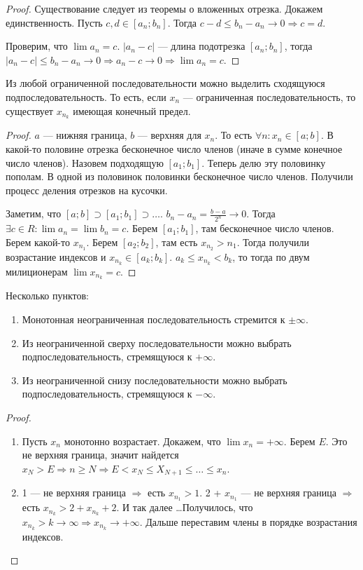 \begin{proof}
    Существование следует из теоремы о вложенных отрезка. Докажем единственность. Пусть $c, d \in [a_n; b_n]$. Тогда  $c-d \le b_n - a_n \to 0 \Rightarrow c = d$.

    Проверим, что $\lim a_n=c$.  $|a_n - c|$ --- длина подотрезка  $[a_n; b_n]$, тогда $|a_n - c| \le b_n - a_n \to 0 \Rightarrow a_n - c \to 0 \Rightarrow \lim a_n = c$.
\end{proof}
\begin{theorem}
    Из любой ограниченной последовательности можно выделить сходящуюся подпоследовательность. То есть, если $x_n$ --- ограниченная последовательность, то существует  $x_{n_k}$ имеющая конечный предел.
\end{theorem}
\begin{proof}
    $a$ --- нижняя граница,  $b$ --- верхняя для  $x_n$. То есть  $\forall n: x_n \in [a; b]$. В какой-то половине отрезка бесконечное число членов (иначе в сумме конечное число членов). Назовем подходящую $[a_1;b_1]$. Теперь делю эту половинку пополам. В одной из половинок половинки бесконечное число членов. Получили процесс деления отрезков на кусочки. 

    Заметим, что $[a; b] \supset [a_1; b_1] \supset \ldots$. $b_n - a_n = \frac{b-a}{2^n} \to 0$. Тогда $\exists c \in R: \lim a_n = \lim b_n = c$. Берем  $[a_1; b_1]$, там бесконечное число членов. Берем какой-то $x_{n_1}$. Берем $[a_2; b_2]$, там есть  $x_{n_2} > n_1$. Тогда получили возрастание индексов и  $x_{n_k} \in [a_k; b_k]$.  $a_k \le x_{n_k} < b_k$, то тогда по двум милиционерам $\lim x_{n_k} = c$.
\end{proof}
\begin{theorem}
    Несколько пунктов:
    \begin{enumerate}
        \item Монотонная неограниченная последовательность стремится к $\pm\infty$.
        \item Из неограниченной сверху последовательности можно выбрать подпоследовательность, стремящуюся к $+\infty$.
        \item Из неограниченной снизу последовательности можно выбрать подпоследовательность, стремящуюся к $-\infty$.
    \end{enumerate}
\end{theorem}
\begin{proof}
    \slashn
    \begin{enumerate}
        \item Пусть $x_n$ монотонно возрастает. Докажем, что  $\lim x_n = +\infty$. Берем  $E$. Это не верхняя граница, значит найдется  $x_N > E \Rightarrow n \ge N \Rightarrow E < x_N \le X_{N+1} \le \ldots \le x_n$.
        \item 1 --- не верхняя граница $\Rightarrow$ есть  $x_{n_1} > 1$. 2 +  $x_{n_1}$ ---  не верхняя граница $\Rightarrow$ есть  $x_{n_k} > 2 + x_{n_k} + 2$. И так далее \ldots Получилось, что $x_{n_k} > k \to \infty \Rightarrow x_{n_k} \to +\infty$. Дальше переставим члены в порядке возрастания индексов.
    \end{enumerate}
\end{proof}
